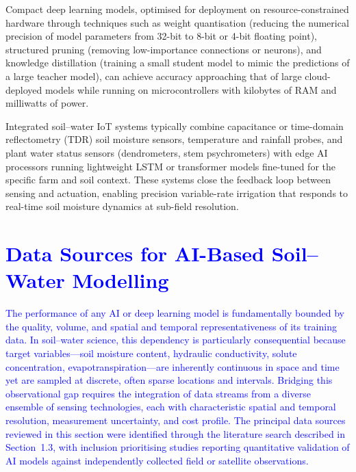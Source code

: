 \documentclass[land,article,submit,pdftex,moreauthors]{Definitions/mdpi}
\numberwithin{equation}{section}
\begin{document}
Compact deep learning models, optimised for deployment on resource-constrained hardware through techniques such as weight quantisation (reducing the numerical precision of model parameters from 32-bit to 8-bit or 4-bit floating point), structured pruning (removing low-importance connections or neurons), and knowledge distillation (training a small student model to mimic the predictions of a large teacher model), can achieve accuracy approaching that of large cloud-deployed models while running on microcontrollers with kilobytes of RAM and milliwatts of power.

Integrated soil--water IoT systems typically combine capacitance or time-domain reflectometry (TDR) soil moisture sensors, temperature and rainfall probes, and plant water status sensors (dendrometers, stem psychrometers) with edge AI processors running lightweight LSTM or transformer models fine-tuned for the specific farm and soil context. These systems close the feedback loop between sensing and actuation, enabling precision variable-rate irrigation that responds to real-time soil moisture dynamics at sub-field resolution.


\section{\textcolor{blue}{Data Sources for AI-Based Soil--Water Modelling}}

\textcolor{blue}{The performance of any AI or deep learning model is fundamentally bounded by the quality, volume, and spatial and temporal representativeness of its training data. In soil--water science, this dependency is particularly consequential because target variables---soil moisture content, hydraulic conductivity, solute concentration, evapotranspiration---are inherently continuous in space and time yet are sampled at discrete, often sparse locations and intervals. Bridging this observational gap requires the integration of data streams from a diverse ensemble of sensing technologies, each with characteristic spatial and temporal resolution, measurement uncertainty, and cost profile. The principal data sources reviewed in this section were identified through the literature search described in Section~1.3, with inclusion prioritising studies reporting quantitative validation of AI models against independently collected field or satellite observations.}
\end{document}
